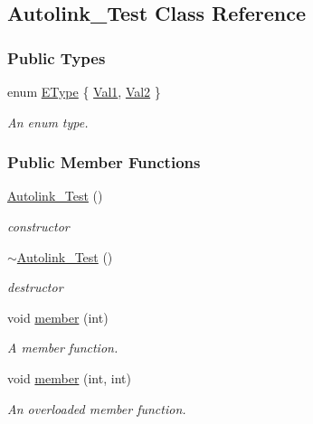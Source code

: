 \hypertarget{class_autolink___test}{}\subsection{Autolink\+\_\+\+Test Class Reference}
\label{class_autolink___test}
\subsubsection*{Public Types}
\begin{DoxyCompactItemize}
\item 
enum \mbox{\hyperlink{class_autolink___test_aeb611627c332d067bded1806b1bb45c2}{E\+Type}} \{ \mbox{\hyperlink{class_autolink___test_aeb611627c332d067bded1806b1bb45c2af70631e295bce280e74762d18af47a94}{Val1}}, 
\mbox{\hyperlink{class_autolink___test_aeb611627c332d067bded1806b1bb45c2a7d760f44a8971559d108a609b8fb9b3b}{Val2}}
 \}
\begin{DoxyCompactList}\small\item\em An enum type. \end{DoxyCompactList}\end{DoxyCompactItemize}
\subsubsection*{Public Member Functions}
\begin{DoxyCompactItemize}
\item 
\mbox{\hyperlink{class_autolink___test_a278d631f9943428c05b17d78f14488e2}{Autolink\+\_\+\+Test}} ()
\begin{DoxyCompactList}\small\item\em constructor \end{DoxyCompactList}\item 
\mbox{\hyperlink{class_autolink___test_a03bf46c8e2b733680035f524fd7b193b}{$\sim$\+Autolink\+\_\+\+Test}} ()
\begin{DoxyCompactList}\small\item\em destructor \end{DoxyCompactList}\item 
void \mbox{\hyperlink{class_autolink___test_a393ea281f235a2f603d98daf72b0d411}{member}} (int)
\begin{DoxyCompactList}\small\item\em A member function. \end{DoxyCompactList}\item 
void \mbox{\hyperlink{class_autolink___test_acf783a43c2b4b6cc9dd2361784eca2e1}{member}} (int, int)
\begin{DoxyCompactList}\small\item\em An overloaded member function. \end{DoxyCompactList}\end{DoxyCompactItemize}
